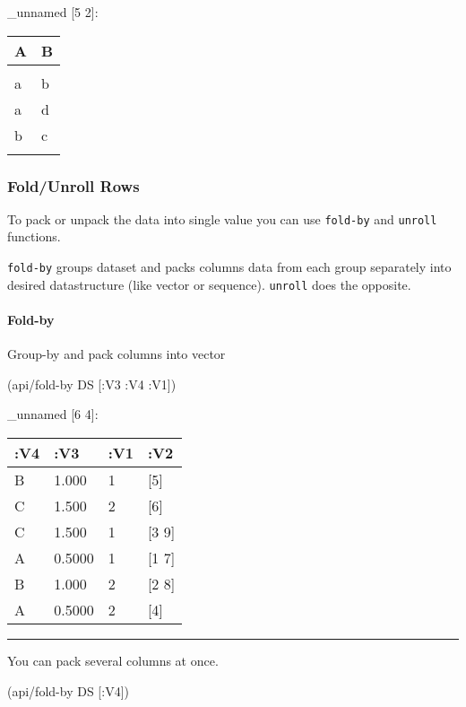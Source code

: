 \documentclass[]{article}
\newenvironment{Shaded}{\begin{snugshade}}{\end{snugshade}}
\newcommand{\AttributeTok}[1]{\textcolor[rgb]{0.77,0.63,0.00}{#1}}
\newcommand{\NormalTok}[1]{#1}
\let\oldparagraph\paragraph
\renewcommand{\paragraph}[1]{\oldparagraph{#1}\mbox{}}
\begin{document}
\_unnamed {[}5 2{]}:

\begin{longtable}[]{@{}ll@{}}
\toprule
A & B\tabularnewline
\midrule
\endhead
&\tabularnewline
a & b\tabularnewline
a & d\tabularnewline
b & c\tabularnewline
&\tabularnewline
\bottomrule
\end{longtable}

\subsubsection{Fold/Unroll Rows}\label{foldunroll-rows}

To pack or unpack the data into single value you can use
\texttt{fold-by} and \texttt{unroll} functions.

\texttt{fold-by} groups dataset and packs columns data from each group
separately into desired datastructure (like vector or sequence).
\texttt{unroll} does the opposite.

\paragraph{Fold-by}\label{fold-by}

Group-by and pack columns into vector

\begin{Shaded}
\begin{Highlighting}[]
\NormalTok{(api/fold-by DS [}\AttributeTok{:V3} \AttributeTok{:V4} \AttributeTok{:V1}\NormalTok{])}
\end{Highlighting}
\end{Shaded}

\_unnamed {[}6 4{]}:

\begin{longtable}[]{@{}llll@{}}
\toprule
:V4 & :V3 & :V1 & :V2\tabularnewline
\midrule
\endhead
B & 1.000 & 1 & {[}5{]}\tabularnewline
C & 1.500 & 2 & {[}6{]}\tabularnewline
C & 1.500 & 1 & {[}3 9{]}\tabularnewline
A & 0.5000 & 1 & {[}1 7{]}\tabularnewline
B & 1.000 & 2 & {[}2 8{]}\tabularnewline
A & 0.5000 & 2 & {[}4{]}\tabularnewline
\bottomrule
\end{longtable}

\begin{center}\rule{0.5\linewidth}{0.5pt}\end{center}

You can pack several columns at once.

\begin{Shaded}
\begin{Highlighting}[]
\NormalTok{(api/fold-by DS [}\AttributeTok{:V4}\NormalTok{])}
\end{Highlighting}
\end{Shaded}
\end{document}

